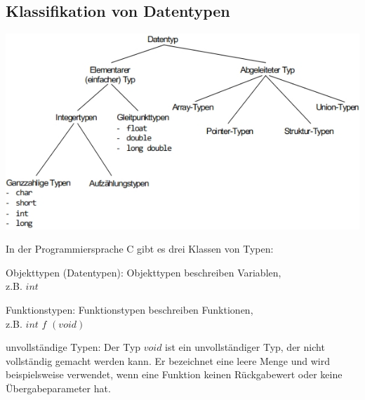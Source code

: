 	\subsection {Klassifikation von Datentypen }
		\begin{minipage}[c]{9 cm}
			\includegraphics[width=1\textwidth]{pics/datentypen_klassifikation.jpg}
		\end{minipage}
		\begin{minipage}[c]{10 cm}
			In der Programmiersprache C gibt es drei Klassen von Typen:
			\begin{compactitem}
				\item Objekttypen (Datentypen): Objekttypen beschreiben Variablen, \\
				z.B. $int$
				\item Funktionstypen: Funktionstypen beschreiben Funktionen, \\
				z.B. $int$ $f$ $(void)$
				\item unvollständige Typen: Der Typ $void$ ist ein unvollständiger Typ, der nicht vollständig gemacht werden kann. Er bezeichnet eine leere Menge und wird beispielsweise verwendet, wenn eine Funktion keinen Rückgabewert oder keine Übergabeparameter hat.
			\end{compactitem}
		\end{minipage}
